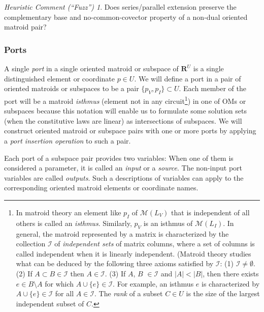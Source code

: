 \documentclass{amsproc-sunycstr}
\def\Reals{\ensuremath{\mathbf R}}
\theoremstyle{plain}
\theoremstyle{definition}
\theoremstyle{remark}
\newtheorem{fuzz}{Heuristic Comment (``Fuzz'')}
\DeclareMathOperator{\rank}{rank}
\begin{document}
\begin{fuzz}
Does series/parallel extension preserve the complementary
base and no-common-covector property of a non-dual oriented matroid 
pair?
\end{fuzz}


\subsubsection{Ports}
A single \textit{port} in a single oriented matroid or subspace of 
$\Reals^U$ is a 
single distinguished element or coordinate $p\in U$.  
We will define a port in a pair of oriented matroids or subspaces to 
be a pair $\{p_V,p_I\}\subset U$.   Each member of the port will be
a matroid \textit{isthmus} (element not in any circuit\footnote{In 
matroid theory an element like $p_I$ of
$\mathcal{M}(L_V)$ that is independent of all others
is called an \textit{isthmus}.
Similarly, $p_V$ is
an isthmus of $\mathcal{M}(L_I)$.  In general, the matroid represented by
a matrix is characterized by the collection $\mathcal{I}$ 
of \textit{independent sets} 
of matrix columns, where a set of columns is called independent when it is
linearly independent.  (Matroid theory studies what can be deduced by 
the following three axioms satisfied by $\mathcal{I}$: (1) 
$\mathcal{I}\neq\emptyset$. 
(2) If $A\subset B\in\mathcal{I}$ then $A\in\mathcal{I}$.  (3) 
If $A$, $B$ $\in\mathcal{I}$ and $|A|<|B|$, then 
there exists $e\in B\setminus A$ 
for which $A\cup\{e\}\in\mathcal{I}$.  For example, an isthmus $e$ is 
characterized by $A\cup\{e\}\in\mathcal{I}$ for all $A\in\mathcal{I}$.
The \textit{rank} of a subset $C\in U$ is the size of the largest independent
subset of $C$.  
})
in one of OMs or subspaces because this notation will
enable us to formulate some solution sets 
(when the constitutive laws are linear)
as intersections of subspaces.
We will construct oriented matroid or subspace pairs with one or more
ports by applying a \textit{port insertion operation} to such a pair.

Each port of a subspace pair provides two variables:  When one of them is 
considered a parameter, it is called an 
\textit{input} or a \textit{source}.
The non-input port variables are called \textit{outputs}.
Such a descriptions of variables can apply to the corresponding 
oriented matroid elements or coordinate names.
\end{document}
